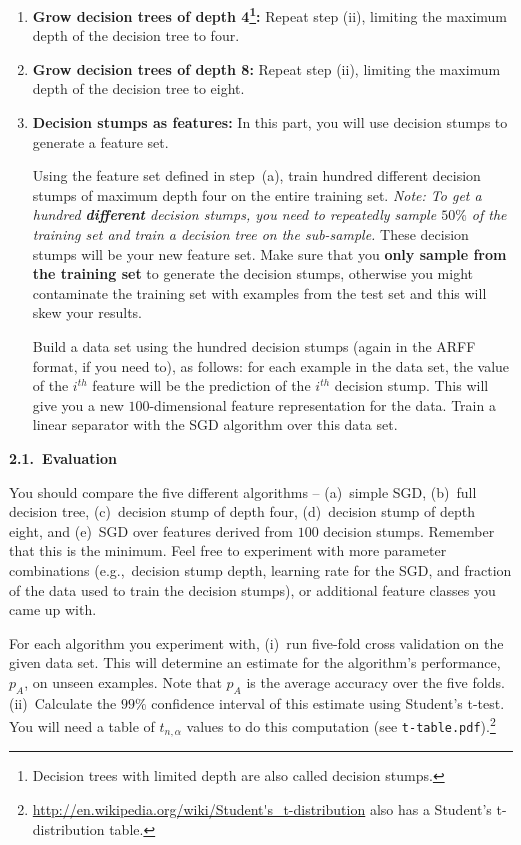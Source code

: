\begin{enumerate}
\begin{enumerate}
\begin{enumerate}
  \item {\bf Grow decision trees of depth 4\footnote{Decision trees with limited depth are also called decision stumps.}:} Repeat step (ii), limiting the maximum
depth of the decision tree to four.

  \item {\bf Grow decision trees of depth 8:} Repeat step (ii), limiting the maximum
depth of the decision tree to eight.

  \item {\bf Decision stumps as features:} In this part, you will
use decision stumps to generate a feature set.

    Using the feature set defined in step~(a), train hundred different
    decision stumps of maximum depth four on the entire training
    set. {\em Note: To get a hundred {\bf different} decision stumps,
      you need to repeatedly sample $50\%$ of the training set and train
      a decision tree on the sub-sample.} These decision stumps will
    be your new feature set.  Make sure that you \textbf{only sample from the
    training set} to generate the decision stumps, otherwise you might
    contaminate the training set with examples from the test set and
    this will skew your results.

    Build a data set using the hundred decision stumps
  (again in the ARFF format, if you need to), as follows: 
  for each example in the data set, the value of the $i^{th}$ feature
    will be the prediction of the $i^{th}$ decision stump.  This will
    give you a new $100$-dimensional feature representation for the data. 
  Train a linear separator with the SGD algorithm over this data set.
    \end{enumerate}
  \end{enumerate}

\textbf{2.1.~Evaluation}

You should compare the five different algorithms -- (a)~simple SGD, (b)~full
decision tree, (c)~decision stump of depth four, (d)~decision stump of depth eight, and
(e)~SGD over features derived from $100$ decision stumps.  Remember that this is the minimum. Feel free to
experiment with more parameter combinations (e.g.,~decision stump depth,
learning rate for the SGD, and fraction of the data used to train the
decision stumps), or additional feature classes you came up with.

For each algorithm you experiment with, (i)~run five-fold cross validation on
the given data set.  This will determine an estimate for the
algorithm's performance, $p_A$, on unseen examples. Note that $p_A$ is the
average accuracy over the five folds. (ii)~Calculate the $99\%$ confidence
interval of this estimate using Student's t-test.
You will need a table of $t_{n, \alpha}$ values to do this computation
(see {\tt t-table.pdf}).\footnote{
\url{http://en.wikipedia.org/wiki/Student's_t-distribution} also has a Student's
t-distribution table.} 


\end{enumerate}
